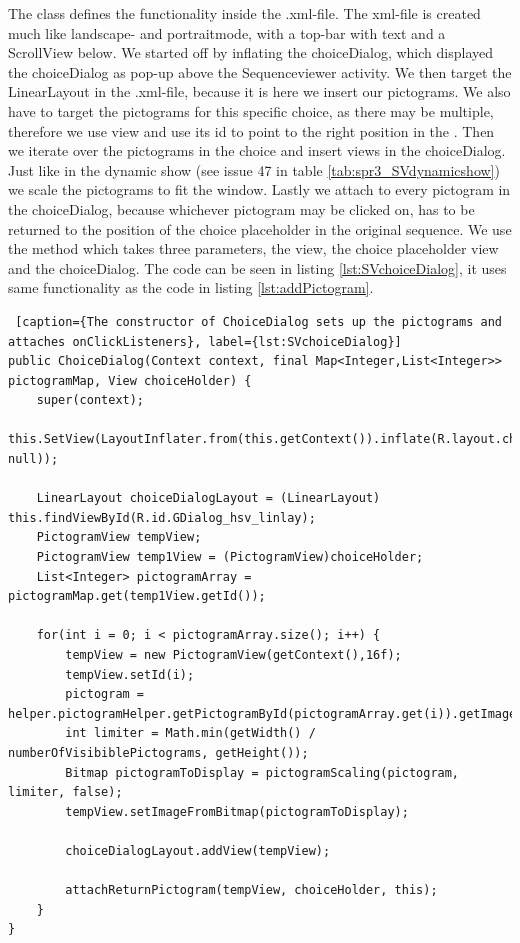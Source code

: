 The  class defines the functionality inside the .xml-file. The xml-file is created much like landscape- and portraitmode, with a top-bar with text and a ScrollView below. We started off by inflating the choiceDialog, which displayed the choiceDialog as pop-up above the Sequenceviewer activity. We then target the LinearLayout in the .xml-file, because it is here we insert our pictograms. We also have to target the pictograms for this specific choice, as there may be multiple, therefore we use  view and use its id to point to the right position in the . Then we iterate over the pictograms in the choice and insert views in the choiceDialog. Just like in the dynamic show (see issue 47 in table \ref{tab:spr3_SVdynamicshow}) we scale the pictograms to fit the window. Lastly we attach  to every pictogram in the choiceDialog, because whichever pictogram may be clicked on, has to be returned to the position of the choice placeholder in the original sequence. We use the  method which takes three parameters, the  view, the choice placeholder view and the choiceDialog. The code can be seen in listing \ref{lst:SVchoiceDialog}, it uses same functionality as the code in listing \ref{lst:addPictogram}.

\begin{lstlisting} [caption={The constructor of ChoiceDialog sets up the pictograms and attaches onClickListeners}, label={lst:SVchoiceDialog}]
public ChoiceDialog(Context context, final Map<Integer,List<Integer>> pictogramMap, View choiceHolder) {
	super(context);
	this.SetView(LayoutInflater.from(this.getContext()).inflate(R.layout.choice_dialog, null));

	LinearLayout choiceDialogLayout = (LinearLayout) this.findViewById(R.id.GDialog_hsv_linlay);
	PictogramView tempView;
	PictogramView temp1View = (PictogramView)choiceHolder;
	List<Integer> pictogramArray = pictogramMap.get(temp1View.getId());

	for(int i = 0; i < pictogramArray.size(); i++) {
		tempView = new PictogramView(getContext(),16f);
		tempView.setId(i);
		pictogram = helper.pictogramHelper.getPictogramById(pictogramArray.get(i)).getImage();
		int limiter = Math.min(getWidth() / numberOfVisibiblePictograms, getHeight());
		Bitmap pictogramToDisplay = pictogramScaling(pictogram, limiter, false);
		tempView.setImageFromBitmap(pictogramToDisplay);

		choiceDialogLayout.addView(tempView);

		attachReturnPictogram(tempView, choiceHolder, this);
	}
}
\end{lstlisting}

